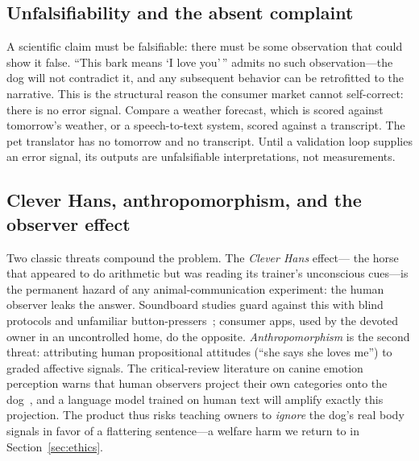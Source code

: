 \subsection{Unfalsifiability and the absent complaint}
A scientific claim must be falsifiable: there must be some observation that
could show it false. ``This bark means `I love you'\,'' admits no such
observation---the dog will not contradict it, and any subsequent behavior
can be retrofitted to the narrative. This is the structural reason the
consumer market cannot self-correct: there is no error signal. Compare a
weather forecast, which is scored against tomorrow's weather, or a
speech-to-text system, scored against a transcript. The pet translator has
no tomorrow and no transcript. Until a validation loop supplies an error
signal, its outputs are unfalsifiable interpretations, not measurements.

\subsection{Clever Hans, anthropomorphism, and the observer effect}
Two classic threats compound the problem. The \emph{Clever Hans} effect---%
the horse that appeared to do arithmetic but was reading its trainer's
unconscious cues---is the permanent hazard of any animal-communication
experiment: the human observer leaks the answer. Soundboard studies guard
against this with blind protocols and unfamiliar
button-pressers~\cite{bastos2024plos}; consumer apps, used by the devoted
owner in an uncontrolled home, do the opposite. \emph{Anthropomorphism} is
the second threat: attributing human propositional attitudes (``she says
she loves me'') to graded affective signals. The critical-review literature
on canine emotion perception warns that human observers project their own
categories onto the dog~\cite{sci2022explainable}, and a language model
trained on human text will amplify exactly this projection. The product
thus risks teaching owners to \emph{ignore} the dog's real body signals in
favor of a flattering sentence---a welfare harm we return to in
Section~\ref{sec:ethics}.

